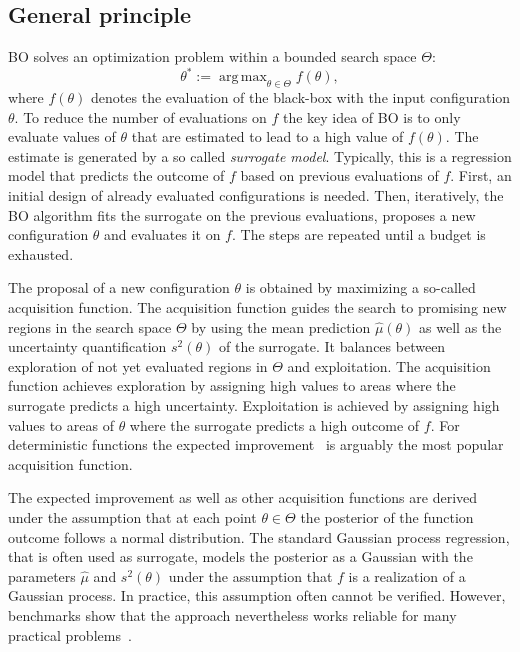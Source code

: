 \documentclass[bimj,fleqn]{w-art}
\theoremstyle{plain}
\theoremstyle{definition}
\begin{document}
\subsection{General principle}
BO solves an optimization problem within a bounded search space $\Theta$:
\[
\theta^\ast := \operatorname{arg\,max}_{\theta \in \Theta} f(\theta),
\]
where $f(\theta)$ denotes the evaluation of the black-box with the input configuration $\theta$.
To reduce the number of evaluations on $f$ the key idea of BO is to only evaluate values of $\theta$ that are estimated to lead to a high value of $f(\theta)$.
The estimate is generated by a so called \emph{surrogate model}.
Typically, this is a regression model that predicts the outcome of $f$ based on previous evaluations of $f$.
First, an initial design of already evaluated configurations is needed.
Then, iteratively, the BO algorithm fits the surrogate on the previous evaluations, proposes a new configuration $\theta$ and evaluates it on $f$.
The steps are repeated until a budget is exhausted.

The proposal of a new configuration $\theta$ is obtained by maximizing a so-called acquisition function.
The acquisition function guides the search to promising new regions in the search space $\Theta$ by using the mean prediction $\hat{\mu}(\theta)$ as well as the uncertainty quantification $s^2(\theta)$ of the surrogate.
It balances between exploration of not yet evaluated regions in $\Theta$ and exploitation.
The acquisition function achieves exploration by assigning high values to areas where the surrogate predicts a high uncertainty.
Exploitation is achieved by assigning high values to areas of $\theta$ where the surrogate predicts a high outcome of $f$.
For deterministic functions the expected improvement~\citep{jones_efficient_1998} is arguably the most popular acquisition function.

The expected improvement as well as other acquisition functions are derived under the assumption that at each point $\theta \in \Theta$ the posterior of the function outcome follows a normal distribution.
The standard Gaussian process regression, that is often used as surrogate, models the posterior as a Gaussian with the parameters $\hat{\mu}$ and $s^2(\theta)$ under the assumption that $f$ is a realization of a Gaussian process.
In practice, this assumption often cannot be verified.
However, benchmarks show that the approach nevertheless works reliable for many practical problems~\citep{bischl_mlrmbo_2017,snoek_practical_2012}.
\end{document}
